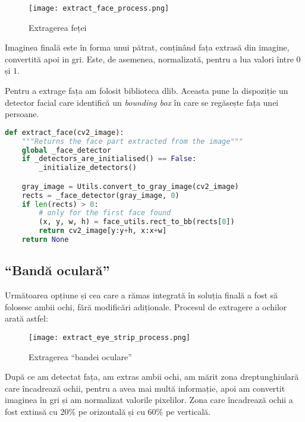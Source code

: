 \begin{figure}[h]
    \centering
    \texttt{[image: extract\_face\_process.png]}
    \caption{Extragerea feței}
    \label{fig_extracted_faces}
\end{figure}

Imaginea finală este în forma unui pătrat, conținând fața extrasă din imagine, convertită apoi in gri.
Este, de asemenea, normalizată, pentru a lua valori între $0$ și $1$.

Pentru a extrage fața am folosit biblioteca dlib.
Aceasta pune la dispoziție un detector facial care identifică un \emph{bounding box} în care se regăsește fața unei persoane.

\begin{lstlisting}[language=Python, caption=Extragerea feței dintr-o imagine]
def extract_face(cv2_image):
    """Returns the face part extracted from the image"""
    global _face_detector
    if _detectors_are_initialised() == False:
        _initialize_detectors()

    gray_image = Utils.convert_to_gray_image(cv2_image)
    rects = _face_detector(gray_image, 0)
    if len(rects) > 0:
        # only for the first face found
        (x, y, w, h) = face_utils.rect_to_bb(rects[0])
        return cv2_image[y:y+h, x:x+w]
    return None
\end{lstlisting}

\subsection{``Bandă oculară''}
Următoarea opțiune și cea care a rămas integrată în soluția finală a fost să folosesc ambii ochi, fără modificări adiționale.
Procesul de extragere a ochilor arată astfel:

\begin{figure}[h]
    \centering
    \texttt{[image: extract\_eye\_strip\_process.png]}
    \caption{Extragerea ``bandei oculare''}
    \label{fig_extracting_eye_strip}
\end{figure}

După ce am detectat fața, am extras ambii ochi, am mărit zona dreptunghiulară care încadrează ochii, pentru a avea mai multă informație, apoi am convertit imaginea în gri și am normalizat valorile pixelilor.
Zona care încadrează ochii a fost extinsă cu 20\% pe orizontală și cu 60\% pe verticală.


